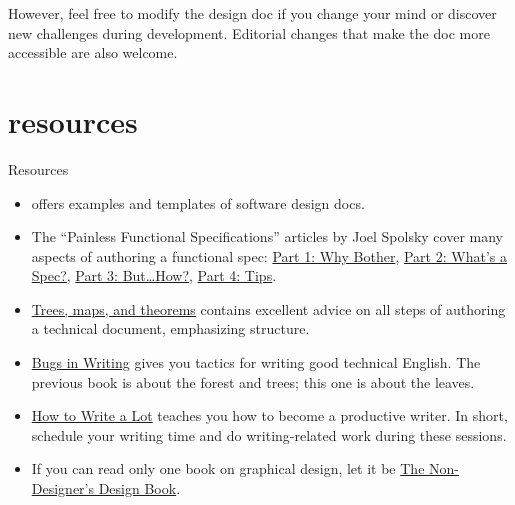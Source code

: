 \documentclass{article}
\begin{document}
However, feel free to modify the design doc if you change your mind or discover new challenges during development.
Editorial changes that make the doc more accessible are also welcome.

\section{resources}{Resources}

\begin{itemize}
\item \href{https://www.designdocs.dev/}{} offers examples and templates of software design docs.
\item The ``Painless Functional Specifications'' articles by Joel Spolsky cover many aspects of authoring a functional spec:
\href{https://www.joelonsoftware.com/2000/10/02/painless-functional-specifications-part-1-why-bother/}{Part 1: Why Bother},
\href{https://www.joelonsoftware.com/2000/10/03/painless-functional-specifications-part-2-whats-a-spec/}{Part 2: What's a Spec?},
\href{https://www.joelonsoftware.com/2000/10/04/painless-functional-specifications-part-3-but-how/}{Part 3: But\ldots  How?},
\href{https://www.joelonsoftware.com/2000/10/15/painless-functional-specifications-part-4-tips/}{Part 4: Tips}.
\item \href{https://www.principiae.be/X0100.php}{Trees, maps, and theorems} contains excellent advice on all steps of authoring a technical document, emphasizing structure.
\item \href{https://www.amazon.com/gp/product/020137921X}{Bugs in Writing} gives you tactics for writing good technical English.
The previous book is about the forest and trees; this one is about the leaves.
\item \href{https://www.amazon.com/gp/product/1433829738}{How to Write a Lot} teaches you how to become a productive writer.
In short, schedule your writing time and do writing-related work during these sessions.
\item If you can read only one book on graphical design, let it be \href{https://www.amazon.com/gp/product/1566091594}{The Non-Designer's Design Book}.
\end{itemize}

\end{document}
